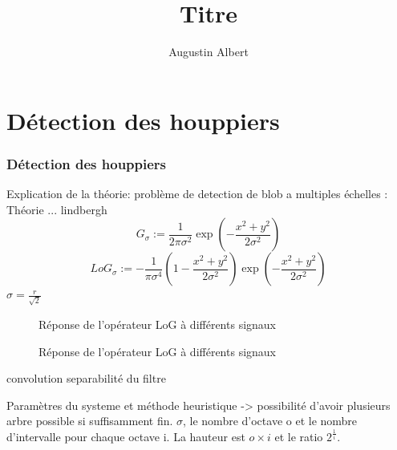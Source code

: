 \documentclass{beamer}
\title{Titre}
\author{Augustin Albert}
\begin{document}
\begin{frame}
	\titlepage
\end{frame}
\begin{frame}
	\tableofcontents
\end{frame}

\section{Détection des houppiers}

\begin{frame}
	\frametitle{Détection des houppiers}
	Explication de la théorie: problème de detection de blob a multiples échelles : Théorie ... lindbergh
	\[G_{\sigma}:=\frac{1}{2\pi\sigma^{2}}\exp(-\frac{x^{2}+y^{2}}{2\sigma^{2}})\]
	\[{LoG}_{\sigma}:=-\frac{1}{\pi\sigma^{4}}(1-\frac{x^{2}+y^{2}}{2\sigma^{2}})\exp(-\frac{x^{2}+y^{2}}{2\sigma^{2}})\] 
	$\sigma=\frac{r}{\sqrt{2}}$
\end{frame}

\begin{frame}
	\begin{figure}
		\subfloat[Réponse à un créneau pour $\sigma=1$, $\sigma=2$ et $\sigma=3$]{\scalebox{0.3}{}}
		\caption{Réponse de l'opérateur LoG à différents signaux}
	\end{figure}
\end{frame}

\begin{frame}
	\begin{figure}
		\subfloat[Réponses à des créneaux pour $\sigma=1$]{\scalebox{0.3}{}}
		\caption{Réponse de l'opérateur LoG à différents signaux}
	\end{figure}
\end{frame}

\begin{frame}
	convolution 
 	separabilité du filtre
\end{frame}

\begin{frame}
	Paramètres du systeme et méthode heuristique -> possibilité d'avoir plusieurs arbre possible si suffisamment fin.
	$\sigma$, le nombre d'octave o et le nombre d'intervalle pour chaque octave i. La hauteur est $o \times i$ et le ratio $2^{\frac{1}{i}}$. 
\end{frame}
\end{document}
